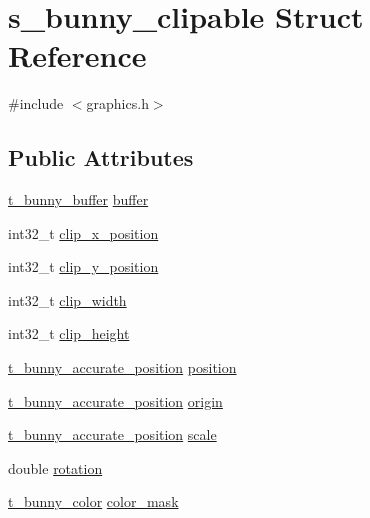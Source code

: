 \hypertarget{structs__bunny__clipable}{\section{s\-\_\-bunny\-\_\-clipable Struct Reference}
\label{structs__bunny__clipable}
}


{\ttfamily \#include $<$graphics.\-h$>$}

\subsection*{Public Attributes}
\begin{DoxyCompactItemize}
\item 
\hyperlink{buffer_8h_aaadbd154c7e3790c2d8ed734f79b64bd}{t\-\_\-bunny\-\_\-buffer} \hyperlink{structs__bunny__clipable_a75da2c183ce6977cf5c7129b08ffec9e}{buffer}
\item 
int32\-\_\-t \hyperlink{structs__bunny__clipable_aa826201c19bd319fb50077b94c727586}{clip\-\_\-x\-\_\-position}
\item 
int32\-\_\-t \hyperlink{structs__bunny__clipable_a996a3ad50bd02d7b43f242dc5c1a293f}{clip\-\_\-y\-\_\-position}
\item 
int32\-\_\-t \hyperlink{structs__bunny__clipable_a41417d3fe3821e2bcd88d5f59a41ff96}{clip\-\_\-width}
\item 
int32\-\_\-t \hyperlink{structs__bunny__clipable_aa742c9aac022401cfdb868f68287e376}{clip\-\_\-height}
\item 
\hyperlink{placement_8h_a0871582e90d8efb086973027e2732c21}{t\-\_\-bunny\-\_\-accurate\-\_\-position} \hyperlink{structs__bunny__clipable_adf79abda47d0b5eb60e4239ad35d8398}{position}
\item 
\hyperlink{placement_8h_a0871582e90d8efb086973027e2732c21}{t\-\_\-bunny\-\_\-accurate\-\_\-position} \hyperlink{structs__bunny__clipable_a87178add83237f9eb800b87b36ee4991}{origin}
\item 
\hyperlink{placement_8h_a0871582e90d8efb086973027e2732c21}{t\-\_\-bunny\-\_\-accurate\-\_\-position} \hyperlink{structs__bunny__clipable_a05f2d5e80b1a6e07ad23b797dc73ac37}{scale}
\item 
double \hyperlink{structs__bunny__clipable_a8726c242b15a9273e6383ada05e96375}{rotation}
\item 
\hyperlink{color_8h_a731d74a9a3165b1f0e5f3102a15419ce}{t\-\_\-bunny\-\_\-color} \hyperlink{structs__bunny__clipable_a457a53d43ab3cb965b66496e5e28f073}{color\-\_\-mask}
\end{DoxyCompactItemize}



